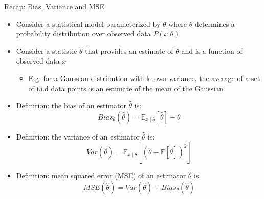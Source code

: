 \documentclass[aspectratio=169]{../latex_main/tntbeamer}  %
\begin{document}
\begin{frame}[c]{Recap: Bias, Variance and MSE}

\begin{itemize}
	\item Consider a statistical model parameterized by $\theta$ where $\theta$ determines
	a probability distribution over observed data $P(x|\theta)$
	\item Consider a statistic $\hat{\theta}$ that provides an estimate of $\theta$ and is a function of
	observed data $x$
	\begin{itemize}
		\item E.g. for a Gaussian distribution with known variance, the average of a set of
		i.i.d data points is an estimate of the mean of the Gaussian
	\end{itemize}
	\item Definition: the bias of an estimator $\hat{\theta}$ is:
	$$ Bias_{\theta} (\hat{\theta}) = \mathbb{E}_{x\mid \theta} [\hat{\theta}] - \theta$$
	\item Definition: the variance of an estimator $\hat{\theta}$ is:
	$$ Var (\hat{\theta}) = \mathbb{E}_{x\mid \theta} [(\hat{\theta} - \mathbb{E}[\hat{\theta}])^2] $$
	\item Definition: mean squared error (MSE) of an estimator $\hat{\theta}$ is
	$$MSE(\hat{\theta}) = Var(\hat{\theta})  + Bias_{\theta} (\hat{\theta}) $$
\end{itemize}

\end{frame}
\end{document}
